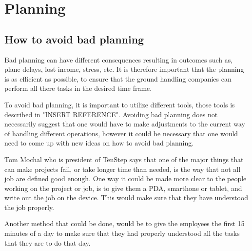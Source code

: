\chapter{Planning}
\section{How to avoid bad planning}

Bad planning can have different consequences resulting in outcomes such as, plane delays, lost income, stress, etc. It is therefore important that the planning is as efficient as possible, to ensure that the ground handling companies can perform all there tasks in the desired time frame.

To avoid bad planning, it is important to utilize different tools, those  tools is described in "INSERT REFERENCE". Avoiding bad planning does not necessarily suggest that one would have to make adjustments to the current way of handling different operations, however it could be necessary that one would need to come up with new ideas on how to avoid bad planning.

Tom Mochal who is president of TenStep \cite{AvoidP_TenStep} says that one of the major things that can make projects fail, or take longer time than needed, is the way that not all job are defined good enough\cite{AvoidP_PoorP}. One way it could be made more clear to the people working on the project or job, is to give them a PDA, smarthone or tablet, and write out the job on the device. This would make sure that they have understood the job properly.

Another method that could be done, would be to give the employees the first 15 minutes of a day to make sure that they had properly understood all the tasks that they are to do that day.
